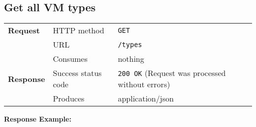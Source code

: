 \subsection{Get all VM types} %

\begin{center}
	\begin{tabularx}{\textwidth}{llX} 
	    \toprule
					\textbf{Request}        &   HTTP method             &   \texttt{GET}			\tabularnewline
		                        			&   URL                     &   \texttt{/types}           	\tabularnewline
                                  &   Consumes                &   nothing					      	\tabularnewline \midrule                       
          \textbf{Response}       &   Success status code     &   \texttt{200 OK} (Request was processed without errors) 	\tabularnewline
                                  &   Produces                &   application/json								\tabularnewline
           \bottomrule
	\end{tabularx}
\end{center}
\pagebreak[3] 	
\pagebreak[3]
		\textbf{Response Example:}
		




